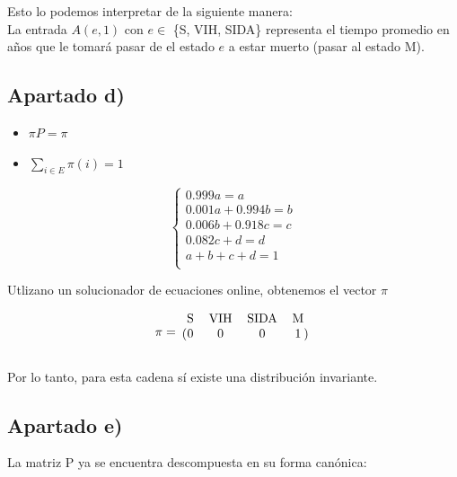 \documentclass[11pt]{article}
\begin{document}
Esto lo podemos interpretar de la siguiente manera: \\
La entrada $A(e, 1)$ con $e \in$ \{S, VIH, SIDA\} representa el tiempo promedio en años
que le tomará pasar de el estado $e$ a estar muerto (pasar al estado M).


\subsection*{Apartado d)}

\begin{itemize}
  \item $\pi P = \pi$
  \item $\displaystyle\sum_{i \in E} \pi(i) = 1$
\end{itemize}

\[
\begin{cases}
  0.999a = a \\
  0.001a + 0.994b=b \\
  0.006b+0.918c=c \\
  0.082c+d = d \\
  a+b+c+d=1 \\
\end{cases}
\]

Utlizano un solucionador de ecuaciones online, obtenemos el vector $\pi$

\begin{equation*}
  \pi = 
  \begin{blockarray}{cccc}
     \text{S} & \text{VIH} & \text{SIDA} & \text{M} \\
    \begin{block}{(cccc)}
      0 & 0 & 0 & 1 \\
    \end{block}
  \end{blockarray}
\end{equation*}

Por lo tanto, para esta cadena sí existe una distribución invariante.


\subsection*{Apartado e)}

La matriz P ya se encuentra descompuesta en su forma canónica:
\end{document}
